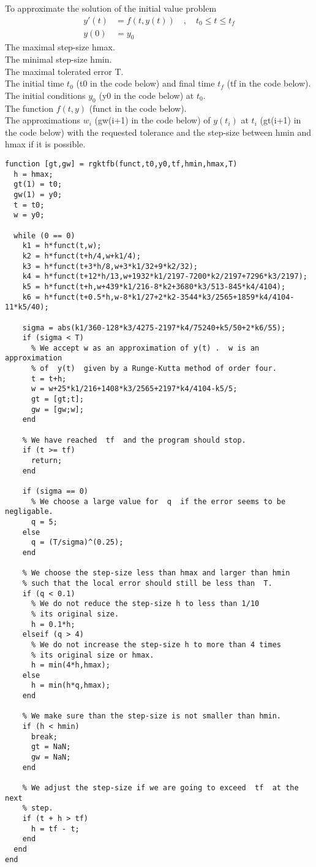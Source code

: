 \begin{code}
To approximate the solution of the initial value problem
\[
\begin{split}
y'(t) &= f(t,y(t)) \quad, \quad t_0 \leq t \leq t_f \\
y(0) &= y_0
\end{split}
\]
 The maximal step-size hmax.\\
The minimal step-size hmin.\\
The maximal tolerated error T.\\
The initial time $t_0$ (t0 in the code below) and final time $t_f$ (tf
in the code below).\\
The initial conditions $y_0$ (y0 in the code below) at $t_0$.\\
The function $f(t,y)$ (funct in the code below). \\
 The approximations $w_i$ (gw(i+1) in the code below)
of $y(t_i)$ at $t_i$ (gt(i+1) in the code below) with
the requested tolerance and the step-size between  hmin
and  hmax  if it is possible.
\small
\begin{verbatim}
function [gt,gw] = rgktfb(funct,t0,y0,tf,hmin,hmax,T)
  h = hmax;
  gt(1) = t0;
  gw(1) = y0;
  t = t0;
  w = y0;

  while (0 == 0)
    k1 = h*funct(t,w);
    k2 = h*funct(t+h/4,w+k1/4);
    k3 = h*funct(t+3*h/8,w+3*k1/32+9*k2/32);
    k4 = h*funct(t+12*h/13,w+1932*k1/2197-7200*k2/2197+7296*k3/2197);
    k5 = h*funct(t+h,w+439*k1/216-8*k2+3680*k3/513-845*k4/4104);
    k6 = h*funct(t+0.5*h,w-8*k1/27+2*k2-3544*k3/2565+1859*k4/4104-11*k5/40);

    sigma = abs(k1/360-128*k3/4275-2197*k4/75240+k5/50+2*k6/55);
    if (sigma < T)
      % We accept w as an approximation of y(t) .  w is an approximation
      % of  y(t)  given by a Runge-Kutta method of order four.
      t = t+h;
      w = w+25*k1/216+1408*k3/2565+2197*k4/4104-k5/5;
      gt = [gt;t];
      gw = [gw;w];
    end
    
    % We have reached  tf  and the program should stop.
    if (t >= tf)
      return;
    end

    if (sigma == 0)
      % We choose a large value for  q  if the error seems to be negligable.
      q = 5;
    else
      q = (T/sigma)^(0.25);
    end

    % We choose the step-size less than hmax and larger than hmin
    % such that the local error should still be less than  T.
    if (q < 0.1)
      % We do not reduce the step-size h to less than 1/10
      % its original size.
      h = 0.1*h;
    elseif (q > 4)
      % We do not increase the step-size h to more than 4 times
      % its original size or hmax.
      h = min(4*h,hmax);
    else
      h = min(h*q,hmax);
    end

    % We make sure than the step-size is not smaller than hmin.
    if (h < hmin)
      break;
      gt = NaN;
      gw = NaN;
    end

    % We adjust the step-size if we are going to exceed  tf  at the next
    % step.
    if (t + h > tf)
      h = tf - t;
    end
  end
end
\end{verbatim}
\end{code}

